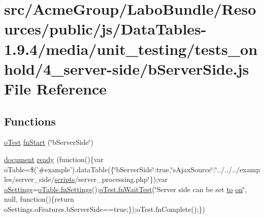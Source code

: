 \hypertarget{4__server-side_2b_server_side_8js}{\section{src/\+Acme\+Group/\+Labo\+Bundle/\+Resources/public/js/\+Data\+Tables-\/1.9.4/media/unit\+\_\+testing/tests\+\_\+onhold/4\+\_\+server-\/side/b\+Server\+Side.js File Reference}
\label{4__server-side_2b_server_side_8js}
}
\subsection*{Functions}
\begin{DoxyCompactItemize}
\item 
\hyperlink{unit__test_8js_a3b2d259e2df3b6860d9047a92d09d0d6}{o\+Test} \hyperlink{4__server-side_2b_server_side_8js_a281093f96172c16dcf44c499648090be}{fn\+Start} (\char`\"{}b\+Server\+Side\char`\"{})
\item 
\hyperlink{outside_events_8js_aa14f8e0338cced6720590fd2ea13bd4b}{document} \hyperlink{4__server-side_2b_server_side_8js_a7afd62153d5241842668222d09b638f5}{ready} (function()\{var o\+Table=\$('\#example').data\+Table(\{\char`\"{}b\+Server\+Side\char`\"{}\+:true,\char`\"{}s\+Ajax\+Source\char`\"{}\+:\char`\"{}../../../examples/server\+\_\+side/\hyperlink{tinymce_8jquery_8dev_8js_a09066d4d580eeec222f858d588b4cdef}{scripts}/server\+\_\+processing.\+php\char`\"{}\});var \hyperlink{model_8settings_8js_a4857b9c813b4dea010668e9555d0aca7}{o\+Settings}=\hyperlink{api_8methods_8js_a78f387fab92a85c2cb7830bc5d8a6141}{o\+Table.\+fn\+Settings}();\hyperlink{onhold_24__server-side_2__zero__config_8js_ab25c4d596771c0133cdc45178ce72c3d}{o\+Test.\+fn\+Wait\+Test}(\char`\"{}Server side can be set \hyperlink{jquery-ui_8js_af6086621f45baa2cf538f19e45d3c263}{to} \hyperlink{fullpage_2plugin_8min_8js_a1cfa98b7fed2aaf9fee3b68dbb7f9497}{on}\char`\"{}, null, function()\{return o\+Settings.\+o\+Features.\+b\+Server\+Side==true;\});o\+Test.\+fn\+Complete();\})
\end{DoxyCompactItemize}


